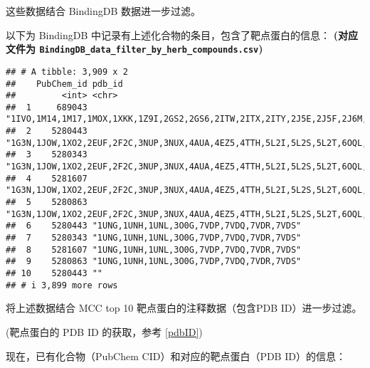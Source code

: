\documentclass[
]{article}
\begin{document}
这些数据结合 BindingDB 数据进一步过滤。

以下为 BindingDB 中记录有上述化合物的条目，包含了靶点蛋白的信息：
\textbf{(对应文件为 \texttt{BindingDB\_data\_filter\_by\_herb\_compounds.csv})}

\begin{verbatim}
## # A tibble: 3,909 x 2
##    PubChem_id pdb_id                                                                                                              
##         <int> <chr>                                                                                                               
##  1     689043 "1IVO,1M14,1M17,1MOX,1XKK,1Z9I,2GS2,2GS6,2ITW,2ITX,2ITY,2J5E,2J5F,2J6M,2N5S,2RF9,2RGP,3B2V,3BEL,3GOP,3POZ,3QWQ,3VJO~
##  2    5280443 "1G3N,1JOW,1XO2,2EUF,2F2C,3NUP,3NUX,4AUA,4EZ5,4TTH,5L2I,5L2S,5L2T,6OQL,6OQO"                                        
##  3    5280343 "1G3N,1JOW,1XO2,2EUF,2F2C,3NUP,3NUX,4AUA,4EZ5,4TTH,5L2I,5L2S,5L2T,6OQL,6OQO"                                        
##  4    5281607 "1G3N,1JOW,1XO2,2EUF,2F2C,3NUP,3NUX,4AUA,4EZ5,4TTH,5L2I,5L2S,5L2T,6OQL,6OQO"                                        
##  5    5280863 "1G3N,1JOW,1XO2,2EUF,2F2C,3NUP,3NUX,4AUA,4EZ5,4TTH,5L2I,5L2S,5L2T,6OQL,6OQO"                                        
##  6    5280443 "1UNG,1UNH,1UNL,3O0G,7VDP,7VDQ,7VDR,7VDS"                                                                           
##  7    5280343 "1UNG,1UNH,1UNL,3O0G,7VDP,7VDQ,7VDR,7VDS"                                                                           
##  8    5281607 "1UNG,1UNH,1UNL,3O0G,7VDP,7VDQ,7VDR,7VDS"                                                                           
##  9    5280863 "1UNG,1UNH,1UNL,3O0G,7VDP,7VDQ,7VDR,7VDS"                                                                           
## 10    5280443 ""                                                                                                                  
## # i 3,899 more rows
\end{verbatim}

将上述数据结合 MCC top 10 靶点蛋白的注释数据（包含PDB ID）进一步过滤。

(靶点蛋白的 PDB ID 的获取，参考 \ref{pdbID})

现在，已有化合物（PubChem CID）和对应的靶点蛋白（PDB ID）的信息：
\end{document}
